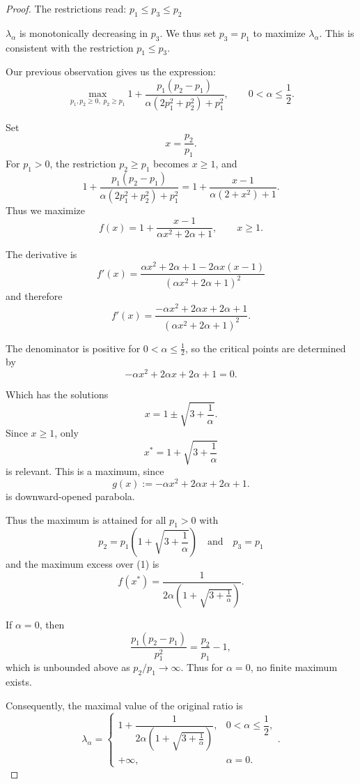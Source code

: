 \documentclass[11pt]{article}
\begin{document}
\begin{proof}
The restrictions read: \(p_1 \le p_3 \le p_2\)

\(\lambda_{\alpha}\) is monotonically decreasing in \(p_3\). 
We thus set \(p_3=p_1\) to maximize \(\lambda_{\alpha}\). 
This is consistent with the restriction \(p_1 \le p_3\).

\break
Our previous observation gives us the expression: 
\[
\max_{p_1,p_2\ge 0,\;p_2\ge p_1}
1+\frac{p_1(p_2-p_1)}{\alpha(2p_1^2+p_2^2)+p_1^2},
\qquad 0<\alpha\le \frac12.
\]

Set
\[
x=\frac{p_2}{p_1}.
\]
For \(p_1>0\), the restriction \(p_2\ge p_1\) becomes \(x\ge 1\), and
\[
1+\frac{p_1(p_2-p_1)}{\alpha(2p_1^2+p_2^2)+p_1^2}
=
1+\frac{x-1}{\alpha(2+x^2)+1}.
\]
Thus we maximize
\[
f(x)=1+\frac{x-1}{\alpha x^2+2\alpha+1},
\qquad x\ge 1.
\]

The derivative is
\[
f'(x)
=
\frac{\alpha x^2+2\alpha+1-2\alpha x(x-1)}
{{(\alpha x^2+2\alpha+1)}^2}
\]
and therefore
\[
f'(x)
=
\frac{-\alpha x^2+2\alpha x+2\alpha+1}
{{(\alpha x^2+2\alpha+1)}^2}.
\]

The denominator is positive for \(0<\alpha\le \frac12\), so the critical points are determined by
\[
-\alpha x^2+2\alpha x+2\alpha+1=0.
\]

Which has the solutions
\[
x
=
1\pm \sqrt{3+\frac1\alpha}.
\]
Since \(x\ge 1\), only
\[
x^*=1+\sqrt{3+\frac1\alpha}
\]
is relevant.
This is a maximum, since  
\[
g(x):=-\alpha x^2+2\alpha x+2\alpha+1.
\]
is downward-opened parabola.


Thus the maximum is attained for all \(p_1>0\) with
\[
\boxed{
p_2=p_1\left(1+\sqrt{3+\frac1\alpha}\right) \quad \text{and} \quad p_3=p_1
}
\]
and the maximum excess over (1) is
\[
\boxed{
f(x^*)
=
\frac{1}{2\alpha\left(1+\sqrt{3+\frac1\alpha}\right)}
}.
\]

If \(\alpha=0\), then
\[
\frac{p_1(p_2-p_1)}{p_1^2}
=
\frac{p_2}{p_1}-1,
\]
which is unbounded above as \(p_2/p_1\to\infty\). Thus for \(\alpha=0\), no finite maximum exists.

Consequently, the maximal value of the original ratio is
\[
\boxed{
\lambda_{\alpha}
=
\begin{cases}
1+\dfrac{1}{2\alpha\left(1+\sqrt{3+\frac1\alpha}\right)},
    & 0<\alpha\le \dfrac12,\\[1.2ex]
+\infty,
    & \alpha=0.
\end{cases}
}.
\]
\end{proof}
\end{document}
